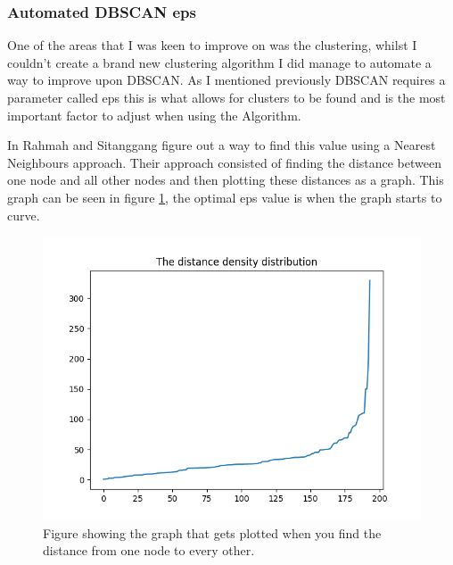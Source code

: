 \subsubsection{Automated DBSCAN eps}

One of the areas that I was keen to improve on was the clustering, whilst I couldn't create a brand new clustering algorithm I did manage to automate a way to improve upon DBSCAN. As I mentioned previously DBSCAN requires a parameter called eps this is what allows for clusters to be found and is the most important factor to adjust when using the Algorithm. 

In \cite{optimal_eps_value_DBSCAN} Rahmah and Sitanggang figure out a way to find this value using a Nearest Neighbours approach. Their approach consisted of finding the distance between one node and all other nodes and then plotting these distances as a graph. This graph can be seen in figure \ref{fig:whole_eps_graph}, the optimal eps value is when the graph starts to curve. 

\begin{figure}[h]
    \centering
    \includegraphics[width=\textwidth]{figures/eps_finder_graph_whole.png}
    \caption{Figure showing the graph that gets plotted when you find the distance from one node to every other.}
    \label{fig:whole_eps_graph}
\end{figure}

